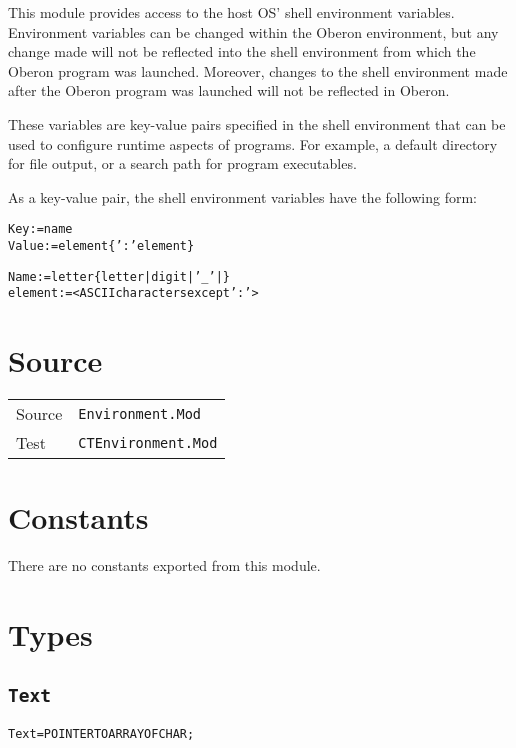 
This module provides access to the host OS' shell environment
variables.  Environment variables can be changed within the Oberon
environment, but any change made will not be reflected into the shell
environment from which the Oberon program was launched.  Moreover,
changes to the shell environment made after the Oberon program was
launched will not be reflected in Oberon.

These variables are key-value pairs specified in the shell
environment that can be used to configure runtime aspects of programs.
For example, a default directory for file output, or a search path for
program executables.

As a key-value pair, the shell environment variables have the
following form:

\begin{alltt}
  Key     := name
  Value   := element \{ ':' element \}

  Name    := letter \{ letter | digit | '_' | \}
  element := <ASCII characters except ':'>
\end{alltt}

\section{Source}

\begin{tabularx}{\textwidth}{lX}
  Source & \texttt{Environment.Mod} \\
  Test & \texttt{CTEnvironment.Mod} \\
\end{tabularx}

\section{Constants}

There are no constants exported from this module.

\section{Types}
\subsection{\texttt{Text}}\label{environment:text}
\begin{alltt}
Text = POINTER TO ARRAY OF CHAR;
\end{alltt}

